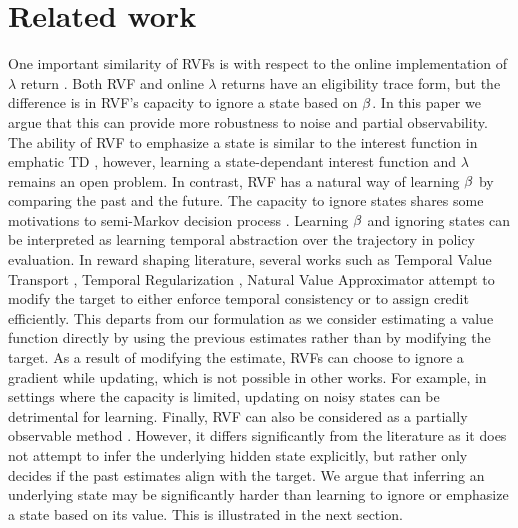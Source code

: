 
\section{Related work}

One important similarity of RVFs is with respect to the online implementation of $\lambda$ return \citep{sutton1998reinforcement,dayan1992convergence}. Both RVF and online $\lambda$ returns have an eligibility trace form, but the difference is in RVF's capacity to ignore a state based on $\beta$. In this paper we argue that this can provide more robustness to noise and partial observability.  The ability of RVF to emphasize a state is similar to the interest function in emphatic TD \citep{mahmood2015emphatic}, however, learning a state-dependant interest function and $\lambda$ remains an open problem. In contrast, RVF has a natural way of learning $\beta$ by comparing the past and the future. The capacity to ignore states shares some motivations to semi-Markov decision process \citep{puterman1990markov}. Learning $\beta$ and ignoring states can be interpreted as learning temporal abstraction over the trajectory in policy evaluation.
In reward shaping literature, several works such as Temporal Value Transport \citep{TVT}, Temporal Regularization \citep{thodoroff2018temporal}, Natural Value Approximator \citep{xu2017natural} attempt to modify the target to either enforce temporal consistency or to assign credit efficiently. This departs from our formulation as we consider estimating a value function directly by using the previous estimates rather than by  modifying the target. As a result of modifying the estimate, RVFs can choose to ignore a gradient while updating, which is not possible in other works. For example, in settings where the capacity is limited, updating on noisy states can be detrimental for learning.
Finally, RVF can also be considered as a partially observable method \citep{kaelbling1998planning}. However, it differs significantly from the literature as it does not attempt to infer the underlying hidden state explicitly, but rather only decides if the past estimates align with the target. We argue that inferring an underlying state may be significantly harder than learning to ignore or emphasize a state based on its value. This is illustrated in the next section.

